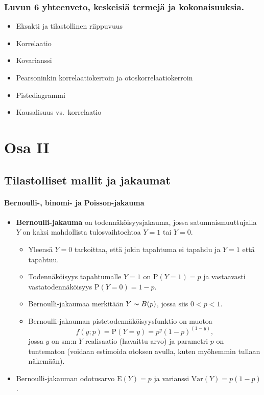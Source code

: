 \documentclass[
]{book}
\providecommand{\tightlist}{%
  \setlength{\itemsep}{0pt}\setlength{\parskip}{0pt}}
\begin{document}
\hypertarget{luvun-6-yhteenveto-keskeisiuxe4-termejuxe4-ja-kokonaisuuksia.}{%
\section{Luvun 6 yhteenveto, keskeisiä termejä ja kokonaisuuksia.}\label{luvun-6-yhteenveto-keskeisiuxe4-termejuxe4-ja-kokonaisuuksia.}}

\begin{itemize}
\tightlist
\item
  Eksakti ja tilastollinen riippuvuus
\item
  Korrelaatio
\item
  Kovarianssi
\item
  Pearsoninkin korrelaatiokerroin ja otoskorrelaatiokerroin
\item
  Pistediagrammi
\item
  Kausalisuus vs.~korrelaatio
\end{itemize}

\hypertarget{part-osa-ii}{%
\part{Osa II}\label{part-osa-ii}}

\hypertarget{luku7}{%
\chapter{Tilastolliset mallit ja jakaumat}\label{luku7}}

\hypertarget{bernoulli--binomi--ja-poisson-jakauma}{%
\subsection{Bernoulli-, binomi- ja Poisson-jakauma}\label{bernoulli--binomi--ja-poisson-jakauma}}

\begin{itemize}
\tightlist
\item
  \textbf{Bernoulli-jakauma} on todennäköisyysjakauma, jossa satunnaismuuttujalla \(Y\) on kaksi mahdollista tulosvaihtoehtoa \(Y=1\) tai \(Y=0\).

  \begin{itemize}
  \tightlist
  \item
    Yleensä \(Y=0\) tarkoittaa, että jokin tapahtuma ei tapahdu ja \(Y=1\) että tapahtuu.
  \item
    Todennäköisyys tapahtumalle \(Y=1\) on \(\text{P}(Y=1)=p\) ja vastaavasti vastatodennäköisyys \(\text{P}(Y=0)=1-p\).
  \item
    Bernoulli-jakaumaa merkitään \(Y \thicksim B(p)\), jossa siis \(0 < p < 1\).
  \item
    Bernoulli-jakauman pistetodennäköisyysfunktio on muotoa
    \[
    f(y; p) = \text{P}(Y=y) = p^y (1-p)^{(1-y)},
    \]
    jossa \(y\) on sm:n \(Y\) realisaatio (havaittu arvo) ja parametri \(p\) on tuntematon (voidaan estimoida otoksen avulla, kuten myöhemmin tullaan näkemään).
  \end{itemize}
\item
  Bernoulli-jakauman odotusarvo \(\text{E}(Y)=p\) ja varianssi \(\mathrm{Var}(Y)=p (1-p)\).
\end{itemize}
\end{document}
